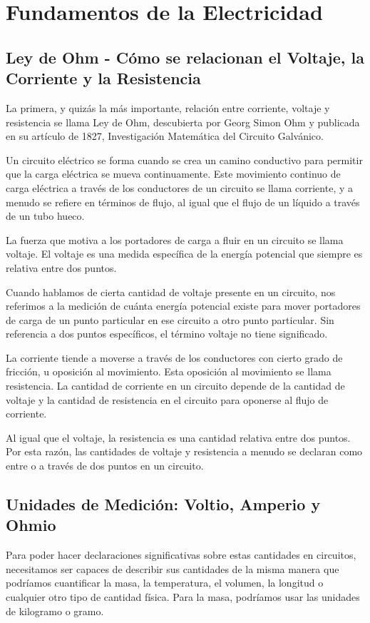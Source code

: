 \documentclass[output=paper, 
colorlinks,
citecolor=brown,
newtxmath
]{langscibook}
\begin{document}
\section{Fundamentos de la Electricidad}




\subsection{Ley de Ohm - Cómo se relacionan el Voltaje, la Corriente y la Resistencia}


La primera, y quizás la más importante, relación entre corriente, voltaje y resistencia se llama Ley de Ohm, descubierta por Georg Simon Ohm y publicada en su artículo de 1827, Investigación Matemática del Circuito Galvánico.

Un circuito eléctrico se forma cuando se crea un camino conductivo para permitir que la carga eléctrica se mueva continuamente. Este movimiento continuo de carga eléctrica a través de los conductores de un circuito se llama corriente, y a menudo se refiere en términos de flujo, al igual que el flujo de un líquido a través de un tubo hueco.

La fuerza que motiva a los portadores de carga a fluir en un circuito se llama voltaje. El voltaje es una medida específica de la energía potencial que siempre es relativa entre dos puntos.

Cuando hablamos de cierta cantidad de voltaje presente en un circuito, nos referimos a la medición de cuánta energía potencial existe para mover portadores de carga de un punto particular en ese circuito a otro punto particular. Sin referencia a dos puntos específicos, el término voltaje no tiene significado.

La corriente tiende a moverse a través de los conductores con cierto grado de fricción, u oposición al movimiento. Esta oposición al movimiento se llama resistencia. La cantidad de corriente en un circuito depende de la cantidad de voltaje y la cantidad de resistencia en el circuito para oponerse al flujo de corriente.

Al igual que el voltaje, la resistencia es una cantidad relativa entre dos puntos. Por esta razón, las cantidades de voltaje y resistencia a menudo se declaran como entre o a través de dos puntos en un circuito.

\subsection{Unidades de Medición: Voltio, Amperio y Ohmio}
Para poder hacer declaraciones significativas sobre estas cantidades en circuitos, necesitamos ser capaces de describir sus cantidades de la misma manera que podríamos cuantificar la masa, la temperatura, el volumen, la longitud o cualquier otro tipo de cantidad física. Para la masa, podríamos usar las unidades de kilogramo o gramo.
\end{document}
